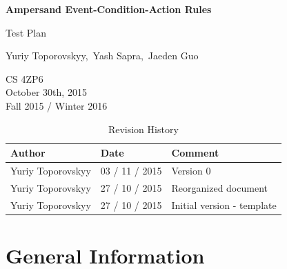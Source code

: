 \documentclass[12pt]{report}
\begin{document}
\begin{titlepage}\begin{center}
\thispagestyle{empty} %

\vspace*{1cm}

{\Huge\textbf{Ampersand Event-Condition-Action Rules}}

\vspace{0.5cm}
{\Large Test Plan

\vspace{1.5cm}
Yuriy Toporovskyy,\ Yash Sapra,\ Jaeden Guo}
\vfill 


\end{center}
CS 4ZP6 \\
October 30th, 2015 \\ 
Fall 2015 / Winter 2016 
\end{titlepage}


\begin{table}[ht!]\begin{center}
\caption{Revision History}  
\begin{tabular}{|l|l|l|}\hline
\textbf{Author} & \textbf{Date} & \textbf{Comment} \\\hline 
Yuriy Toporovskyy & 03 / 11 / 2015 & Version 0 \\\hline
Yuriy Toporovskyy & 27 / 10 / 2015 & Reorganized document \\\hline
Yuriy Toporovskyy & 27 / 10 / 2015 & Initial version - template \\\hline
\end{tabular}
\end{center}\end{table}

\newpage

\tableofcontents

\newpage
{} %

%
%

\chapter{General Information}\label{ch:General}
\end{document}
